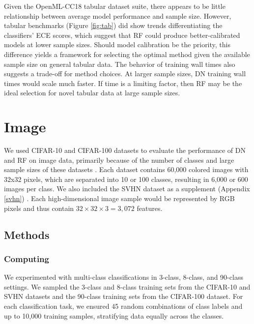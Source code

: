 Given the OpenML-CC18 tabular dataset suite, there appears to be little relationship between average model performance and sample size. However, tabular benchmarks (Figure \ref{fig:tab}) did show trends differentiating the classifiers' ECE scores, which suggest that RF could produce better-calibrated models at lower sample sizes. Should model calibration be the priority, this difference yields a framework for selecting the optimal method given the available sample size on general tabular data. The behavior of training wall times also suggests a trade-off for method choices. At larger sample sizes, DN training wall times would scale much faster. If time is a limiting factor, then RF may be the ideal selection for novel tabular data at large sample sizes.

\section{Image}
\label{image}
We used CIFAR-10 and CIFAR-100 datasets to evaluate the performance of DN and RF on image data, primarily because of the number of classes and large sample sizes of these datasets \citep{cifar}.
Each dataset contains 60,000 colored images with 32x32 pixels, which are separated into 10 or 100 classes, resulting in 6,000 or 600 images per class.
We also included the SVHN dataset as a supplement (Appendix \ref{svhn}) \citep{svhn}. 
Each high-dimensional image sample would be represented by RGB pixels and thus contain $32 \times 32 \times 3 = 3,072$ features.

\subsection{Methods}
\subsubsection{Computing}
We experimented with multi-class classifications in 3-class, 8-class, and 90-class settings. We sampled the 3-class and 8-class training sets from the CIFAR-10 and SVHN datasets and the 90-class training sets from the CIFAR-100 dataset. For each classification task, we ensured 45 random combinations of class labels and up to 10,000 training samples, stratifying data equally across the classes.

